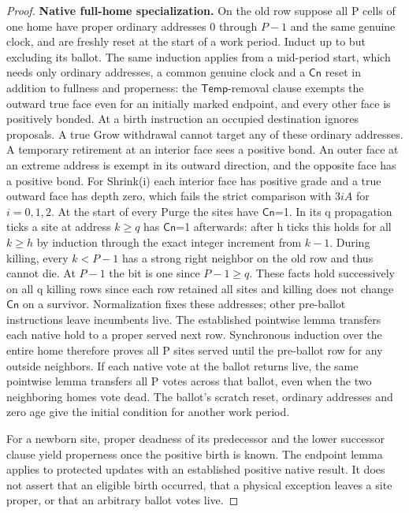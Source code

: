 \begin{proof}
\textbf{Native full-home specialization.} On the old row suppose all P cells of one home have proper ordinary addresses 0 through \(P- 1\) and the same genuine clock, and are freshly reset at the start of a work period. Induct up to but excluding its ballot. The same induction applies from a mid-period start, which needs only ordinary addresses, a common genuine clock and a \(\mathsf{Cn}\) reset in addition to fullness and properness: the \(\mathsf{Temp}\)-removal clause exempts the outward true face even for an initially marked endpoint, and every other face is positively bonded. At a birth instruction an occupied destination ignores proposals. A true Grow withdrawal cannot target any of these ordinary addresses. A temporary retirement at an interior face sees a positive bond. An outer face at an extreme address is exempt in its outward direction, and the opposite face has a positive bond. For Shrink(i) each interior face has positive grade and a true outward face has depth zero, which fails the strict comparison with \(3iA\) for \(i=0,1,2\). At the start of every Purge the sites have \(\mathsf{Cn}\)=1. In its q propagation ticks a site at address \(k\ge q\) has \(\mathsf{Cn}\)=1 afterwards: after h ticks this holds for all \(k\ge h\) by induction through the exact integer increment from \(k- 1\). During killing, every \(k<P- 1\) has a strong right neighbor on the old row and thus cannot die. At \(P- 1\) the bit is one since \(P- 1\ge q\). These facts hold successively on all q killing rows since each row retained all sites and killing does not change \(\mathsf{Cn}\) on a survivor. Normalization fixes these addresses; other pre-ballot instructions leave incumbents live. The established pointwise lemma transfers each native hold to a proper served next row. Synchronous induction over the entire home therefore proves all P sites served until the pre-ballot row for any outside neighbors. If each native vote at the ballot returns live, the same pointwise lemma transfers all P votes across that ballot, even when the two neighboring homes vote dead. The ballot's scratch reset, ordinary addresses and zero age give the initial condition for another work period.

For a newborn site, proper deadness of its predecessor and the lower successor clause yield properness once the positive birth is known. The endpoint lemma applies to protected updates with an established positive native result. It does not assert that an eligible birth occurred, that a physical exception leaves a site proper, or that an arbitrary ballot votes live.
\end{proof}


